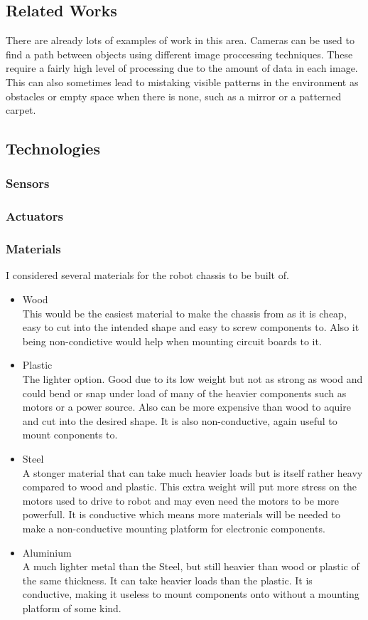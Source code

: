 \documentclass[11pt,fleqn,twoside]{article}
\begin{document}
\subsection{Related Works}
There are already lots of examples of work in this area.  Cameras can be used to find a path between objects using different image proccessing techniques.  These require a fairly high level of processing due to the amount of data in each image.  This can also sometimes lead to mistaking visible patterns in the environment as obstacles or empty space when there is none, such as a mirror or a patterned carpet. %
\subsection{Technologies}

\subsubsection{Sensors}

\subsubsection{Actuators}

\subsubsection{Materials}
I considered several materials for the robot chassis to be built of.
\begin{itemize}
\item Wood
\\This would be the easiest material to make the chassis from as it is cheap, easy to cut into the intended shape and easy to screw components to.  Also it being non-condictive would help when mounting circuit boards to it.
\item Plastic
\\The lighter option.  Good due to its low weight but not as strong as wood and could bend or snap under load of many of the heavier components such as motors or a power source.  Also can be more expensive than wood to aquire and cut into the desired shape.  It is also non-conductive, again useful to mount conponents to.
\item Steel
\\A stonger material that can take much heavier loads but is itself rather heavy compared to wood and plastic.  This extra weight will put more stress on the motors used to drive to robot and may even need the motors to be more powerfull.  It is conductive which means more materials will be needed to make a non-conductive mounting platform for electronic components.
\item Aluminium
\\A much lighter metal than the Steel, but still heavier than wood or plastic of the same thickness.  It can take heavier loads than the plastic. It is conductive, making it useless to mount components onto without a mounting platform of some kind.
\end{itemize}
\end{document}
